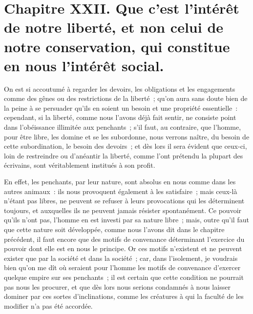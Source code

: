 \documentclass[french,twoside]{book} %
\newcommand\chapteropen{} %
\newcommand\chaptercont{} %
\begin{document}
\chapteropen
\chapter[{Chapitre XXII. Que c’est l’intérêt de notre liberté, et non celui de notre conservation, qui constitue en nous l’intérêt social.}]{Chapitre XXII. Que c’est l’intérêt de notre liberté, et non celui de notre conservation, qui constitue en nous l’intérêt social.}\renewcommand{\leftmark}{Chapitre XXII. Que c’est l’intérêt de notre liberté, et non celui de notre conservation, qui constitue en nous l’intérêt social.}


\chaptercont
\noindent On est si accoutumé à regarder les devoirs, les obligations et les engagements comme des gênes ou des restrictions de la liberté ; qu’on aura sans doute bien de la peine à se persuader qu’ils en soient un besoin et une propriété essentielle : cependant, si la liberté, comme nous l’avons déjà fait sentir, ne consiste point dans l’obéissance illimitée aux penchants ; s’il faut, au contraire, que l’homme, pour être libre, les domine et se les subordonne, nous verrons naître, du besoin de cette subordination, le besoin des devoirs ; et dès lors il sera évident que ceux-ci, loin de restreindre ou d’anéantir la liberté, comme l’ont prétendu la plupart des écrivains, sont véritablement institués à son profit.\par
En effet, les penchants, par leur nature, sont absolus en nous comme dans les autres animaux : ils nous provoquent également à les satisfaire ; mais ceux-là n’étant pas libres, ne peuvent se refuser à leurs provocations qui les déterminent toujours, et auxquelles ils ne peuvent jamais résister spontanément. Ce pouvoir qu’ils n’ont pas, l’homme en est investi par sa nature libre ; mais, outre qu’il faut que cette nature soit développée, comme nous l’avons dit dans le chapitre précédent, il faut encore que des motifs de convenance déterminant l’exercice du pouvoir dont elle est en nous le principe. Or ces motifs n’existent et ne peuvent exister que par la société et dans la société ; car, dans l’isolement, je voudrais bien qu’on me dît où seraient pour l’homme les motifs de convenance d’exercer quelque empire sur ses penchants ; il est certain que cette condition ne pourrait pas nous les procurer, et que dès lors nous serions condamnés à nous laisser dominer par ces sortes d’inclinations, comme les créatures à qui la faculté de les modifier n’a pas été accordée.\par
\end{document}
